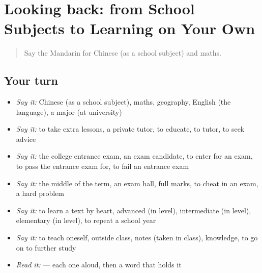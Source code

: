 \section[(dialogue)]{Looking back: from School Subjects to Learning on Your Own}

\label{lesson:ZH-R497-review-492-497}



\begin{quote}
Say the Mandarin for Chinese (as a school subject) and maths.
\end{quote}

\subsection*{Your turn}
\begin{itemize}
\raggedright
  \item \emph{Say it:} Chinese (as a school subject), maths, geography, English (the language), a major (at university)
  \item \emph{Say it:} to take extra lessons, a private tutor, to educate, to tutor, to seek advice
  \item \emph{Say it:} the college entrance exam, an exam candidate, to enter for an exam, to pass the entrance exam for, to fail an entrance exam
  \item \emph{Say it:} the middle of the term, an exam hall, full marks, to cheat in an exam, a hard problem
  \item \emph{Say it:} to learn a text by heart, advanced (in level), intermediate (in level), elementary (in level), to repeat a school year
  \item \emph{Say it:} to teach oneself, outside class, notes (taken in class), knowledge, to go on to further study
  \item \emph{Read it:}    — each one aloud, then a word that holds it
\end{itemize}

